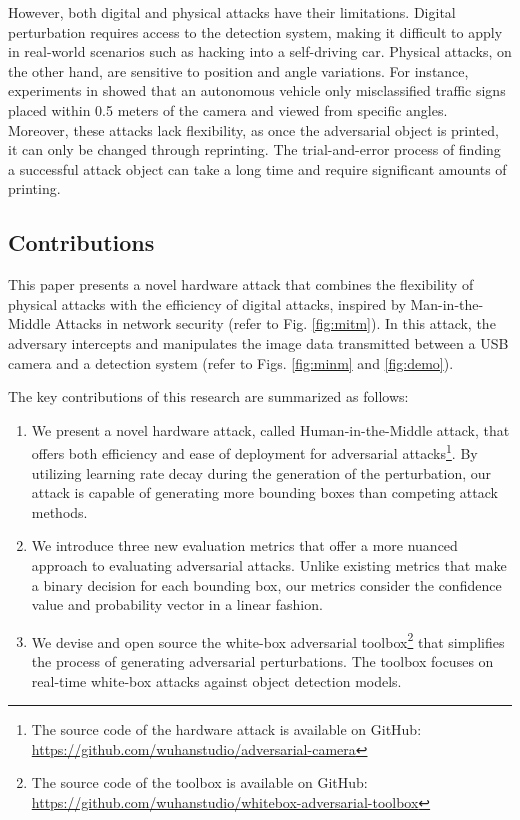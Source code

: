 However, both digital and physical attacks have their limitations. Digital perturbation requires access to the detection system, making it difficult to apply in real-world scenarios such as hacking into a self-driving car. Physical attacks, on the other hand, are sensitive to position and angle variations. For instance, experiments in \citep{LuSFF17} showed that an autonomous vehicle only misclassified traffic signs placed within 0.5 meters of the camera and viewed from specific angles. Moreover, these attacks lack flexibility, as once the adversarial object is printed, it can only be changed through reprinting. The trial-and-error process of finding a successful attack object can take a long time and require significant amounts of printing.

\subsection{Contributions}

This paper presents a novel hardware attack that combines the flexibility of physical attacks with the efficiency of digital attacks, inspired by Man-in-the-Middle Attacks in network security (refer to Fig. \ref{fig:mitm}). In this attack, the adversary intercepts and manipulates the image data transmitted between a USB camera and a detection system (refer to Figs. \ref{fig:minm} and \ref{fig:demo}). 

The key contributions of this research are summarized as follows:

\begin{enumerate}
    \item We present a novel hardware attack, called Human-in-the-Middle  attack, that offers both efficiency and ease of deployment for adversarial attacks\footnote{The source code of the hardware attack is available on GitHub: \url{https://github.com/wuhanstudio/adversarial-camera}}. By utilizing learning rate decay during the generation of the perturbation, our attack is capable of generating more bounding boxes than competing attack methods.
    \item We introduce three new evaluation metrics that offer a more nuanced approach to evaluating adversarial attacks. Unlike existing metrics that make a binary decision for each bounding box, our metrics consider the confidence value and probability vector in a linear fashion.
    \item We devise and open source the white-box adversarial toolbox\footnote{The source code of the toolbox is available on GitHub: \url{https://github.com/wuhanstudio/whitebox-adversarial-toolbox}} that simplifies the process of generating adversarial perturbations. The toolbox focuses on real-time white-box attacks against object detection models.
\end{enumerate}

